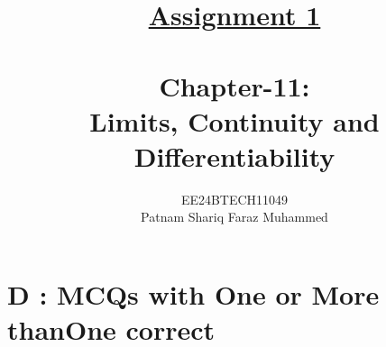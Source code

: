\documentclass[journal,12pt,twocolumn]{IEEEtran}
\theoremstyle{remark}
\begin{document}


\title{{\uline{Assignment 1 \\ } \\}Chapter-11: \\Limits, Continuity and Differentiability}
\author{{EE24BTECH11049 \\ Patnam Shariq Faraz Muhammed}}


 
\maketitle
\newpage
\bigskip

\renewcommand{\thefigure}{\theenumi}
\renewcommand{\thetable}{\theenumi}

\section*{D : MCQs with One or More thanOne correct}
\end{document}
